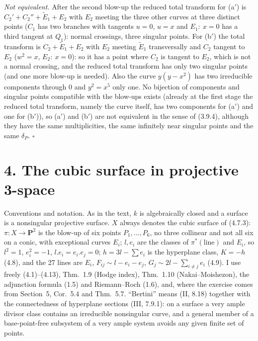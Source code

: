 \documentclass[11pt]{article}
\begin{document}
\emph{Not equivalent.} After the second blow-up the reduced total transform for (a$'$) is $C_2'+C_2''+\widetilde E_1+E_2$ with $E_2$ meeting the three other curves at three distinct points ($C_1$ has two branches with tangents $u=0$, $u=x$ and $E_1:\ x=0$ has a third tangent at $Q_1$): normal crossings, three singular points. For (b$'$) the total transform is $C_2+\widetilde E_1+E_2$ with $E_2$ meeting $\widetilde E_1$ transversally and $C_2$ tangent to $E_2$ ($w^2=x$, $E_2:\ x=0$): so it has a point where $C_2$ is tangent to $E_2$, which is not a normal crossing, and the reduced total transform has only two singular points (and one more blow-up is needed). Also the curve $y(y-x^2)$ has two irreducible components through $0$ and $y^2=x^5$ only one. No bijection of components and singular points compatible with the blow-ups exists (already at the first stage the reduced total transform, namely the curve itself, has two components for (a$'$) and one for (b$'$)), so (a$'$) and (b$'$) are not equivalent in the sense of (3.9.4), although they have the same multiplicities, the same infinitely near singular points and the same $\delta_P$. \hfill$\square$

\section*{4. The cubic surface in projective 3-space}

Conventions and notation. As in the text, $k$ is algebraically closed and a surface is a nonsingular projective surface. $X$ always denotes the cubic surface of (4.7.3): $\pi:X\to\mathbf P^2$ is the blow-up of six points $P_1,\dots,P_6$, no three collinear and not all six on a conic, with exceptional curves $E_i$; $l,e_i$ are the classes of $\pi^*(\text{line})$ and $E_i$, so $l^2=1$, $e_i^2=-1$, $l.e_i=e_i.e_j=0$; $h=3l-\sum e_i$ is the hyperplane class, $K=-h$ (4.8), and the 27 lines are $E_i$, $F_{ij}\sim l-e_i-e_j$, $G_j\sim 2l-\sum_{i\neq j}e_i$ (4.9). I use freely (4.1)--(4.13), Thm.~1.9 (Hodge index), Thm.~1.10 (Nakai--Moishezon), the adjunction formula (1.5) and Riemann--Roch (1.6), and, where the exercise comes from Section~5, Cor.~5.4 and Thm.~5.7. ``Bertini'' means (II, 8.18) together with the connectedness of hyperplane sections (III, 7.9.1): on a surface a very ample divisor class contains an irreducible nonsingular curve, and a general member of a base-point-free subsystem of a very ample system avoids any given finite set of points.
\end{document}
